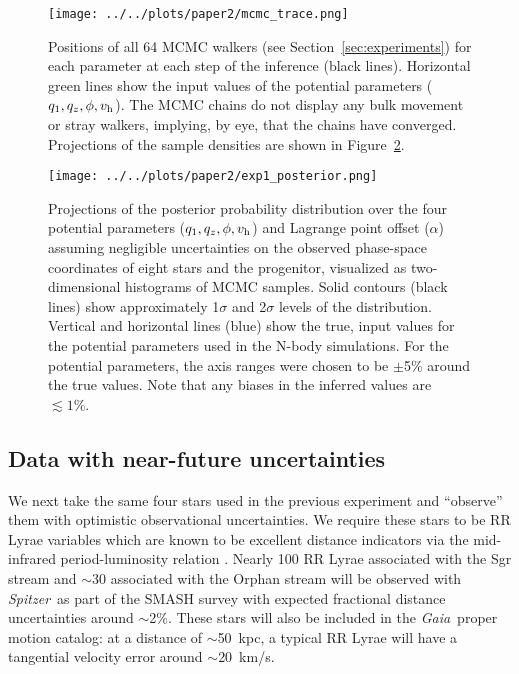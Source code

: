 \documentclass[letterpaper,12pt,preprint]{aastex}
\newcommand{\project}[1]{\textsl{#1}}
\newcommand{\gaia}{\project{Gaia}}
\newcommand{\spitzer}{\project{Spitzer}~}
\newcommand{\vhalo}{v_{\rm h}}
\newcommand{\potp}{$q_1,q_z,\phi,\vhalo$}
\begin{document}
\begin{figure}[!ht]
\begin{center}
\texttt{[image: ../../plots/paper2/mcmc\_trace.png]}
\caption{ Positions of all 64 MCMC walkers (see Section~\ref{sec:experiments}) for each parameter at each step of the inference (black lines). Horizontal green lines show the input values of the potential parameters (\potp). The MCMC chains do not display any bulk movement or stray walkers, implying, by eye, that the chains have converged. Projections of the sample densities are shown in Figure~\ref{fig:exp1_posterior}. }\label{fig:trace}
\end{center}
\end{figure}

\begin{figure}[!ht]
\begin{center}
\texttt{[image: ../../plots/paper2/exp1\_posterior.png]}
\caption{ Projections of the posterior probability distribution over the four potential parameters (\potp) and Lagrange point offset ($\alpha$) assuming negligible uncertainties on the observed phase-space coordinates of eight stars and the progenitor, visualized as two-dimensional histograms of MCMC samples. Solid contours (black lines) show approximately 1$\sigma$ and 2$\sigma$ levels of the distribution. Vertical and horizontal lines (blue) show the true, input values for the potential parameters used in the N-body simulations. For the potential parameters, the axis ranges were chosen to be $\pm$5\% around the true values. Note that any biases in the inferred values are $\lesssim1\%$. }\label{fig:exp1_posterior}
\end{center}
\end{figure}

\subsection{Data with near-future uncertainties}\label{sec:exp2}
We next take the same four stars used in the previous experiment and ``observe'' them with optimistic observational uncertainties. We require these stars to be RR Lyrae variables which are known to be excellent distance indicators via the mid-infrared period-luminosity relation \citep[as shown in, e.g.,][]{madore12}. Nearly 100 RR Lyrae associated with the Sgr stream and $\sim$30 associated with the Orphan stream will be observed with \spitzer as part of the SMASH survey \citep{smashprop} with expected fractional distance uncertainties around $\sim$2\%. These stars will also be included in the \gaia\, proper motion catalog: at a distance of $\sim$50~kpc, a typical RR Lyrae will have a tangential velocity error around $\sim$20~km/s.
\end{document}
